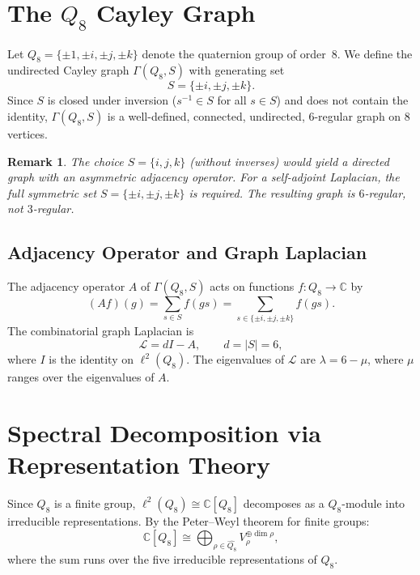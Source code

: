 \documentclass[11pt,a4paper]{article}
\newtheorem{remark}{Remark}
\begin{document}
  \section{The $Q_8$ Cayley Graph}

    Let $Q_8 = \{{\pm 1, \pm i, \pm j, \pm k}\}$ denote the quaternion group of order~8.
    We define the undirected Cayley graph $\Gamma(Q_8, S)$ with generating set
    \begin{equation}
      S = \{\pm i, \pm j, \pm k\}.
    \end{equation}
    Since $S$ is closed under inversion ($s^{-1} \in S$ for all $s \in S$) and does
    not contain the identity, $\Gamma(Q_8, S)$ is a well-defined, connected, undirected,
    $6$-regular graph on $8$ vertices.

    \begin{remark}
      The choice $S = \{i, j, k\}$ (without inverses) would yield a directed graph with an
      asymmetric adjacency operator.
      For a self-adjoint Laplacian, the full symmetric set $S = \{\pm i, \pm j, \pm k\}$ is
      required.
      The resulting graph is $6$-regular, not $3$-regular.
    \end{remark}

    \subsection{Adjacency Operator and Graph Laplacian}

      The adjacency operator $A$ of $\Gamma(Q_8, S)$ acts on functions
      $f \colon Q_8 \to \mathbb{C}$ by
      \begin{equation}
        (Af)(g) = \sum_{s \in S} f(gs)
      = \sum_{s \in \{\pm i, \pm j, \pm k\}} f(gs).
      \end{equation}
      The combinatorial graph Laplacian is
      \begin{equation}
        \mathcal{L} = dI - A, \qquad d = |S| = 6,
      \end{equation}
      where $I$ is the identity on $\ell^2(Q_8)$.
      The eigenvalues of $\mathcal{L}$ are $\lambda = 6 - \mu$, where $\mu$ ranges over
      the eigenvalues of $A$.

  \section{Spectral Decomposition via Representation Theory}

    Since $Q_8$ is a finite group, $\ell^2(Q_8) \cong \mathbb{C}[Q_8]$ decomposes
    as a $Q_8$-module into irreducible representations.
    By the Peter--Weyl theorem for finite groups:
    \begin{equation}
      \mathbb{C}[Q_8] \cong \bigoplus_{\rho \in \widehat{Q_8}} V_\rho^{\oplus \dim \rho},
    \end{equation}
    where the sum runs over the five irreducible representations of $Q_8$.
\end{document}
